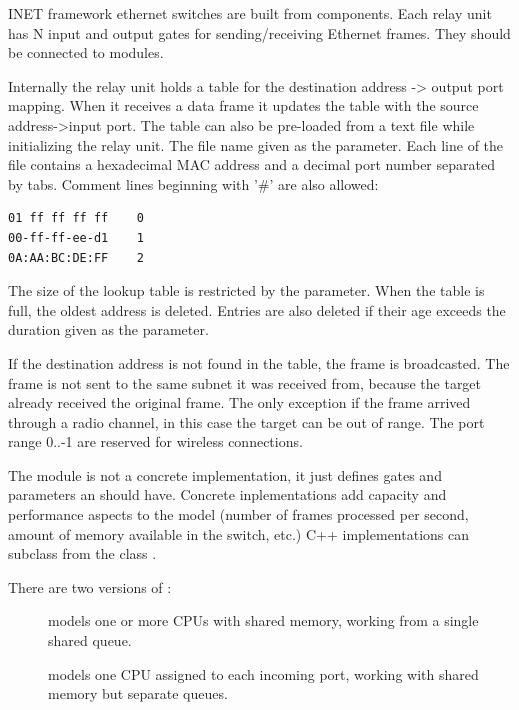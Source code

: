 INET framework ethernet switches are built from 
components. Each relay unit has N input and output gates for sending/receiving
Ethernet frames. They should be connected to  modules.

Internally the relay unit holds a table for the destination address -> output
port mapping. When it receives a data frame it updates the table with the
source address->input port. The table can also be pre-loaded from a text file
while initializing the relay unit. The file name given as the 
parameter. Each line of the file contains a hexadecimal MAC address and a decimal port
number separated by tabs. Comment lines beginning with '\#' are also allowed:

\begin{verbatim}
01 ff ff ff ff    0
00-ff-ff-ee-d1    1
0A:AA:BC:DE:FF    2
\end{verbatim}


The size of the lookup table is restricted by the  parameter.
When the table is full, the oldest address is deleted. Entries are also deleted
if their age exceeds the duration given as the  parameter.

If the destination address is not found in the table, the frame is broadcasted.
The frame is not sent to the same subnet it was received from, because the
target already received the original frame. The only exception if the frame
arrived through a radio channel, in this case the target can be out of range.
The port range 0..-1 are reserved for wireless connections.

The  module is not a concrete implementation,
it just defines gates and parameters an  should have.
Concrete inplementations add
capacity and performance aspects to the model (number of frames processed
per second, amount of memory available in the switch, etc.)
C++ implementations can subclass from the class .

There are two versions of :

\begin{description}
  \item[] models one or more CPUs with shared memory,
    working from a single shared queue.
  \item[] models one CPU assigned to each incoming port,
    working with shared memory but separate queues.
\end{description}

